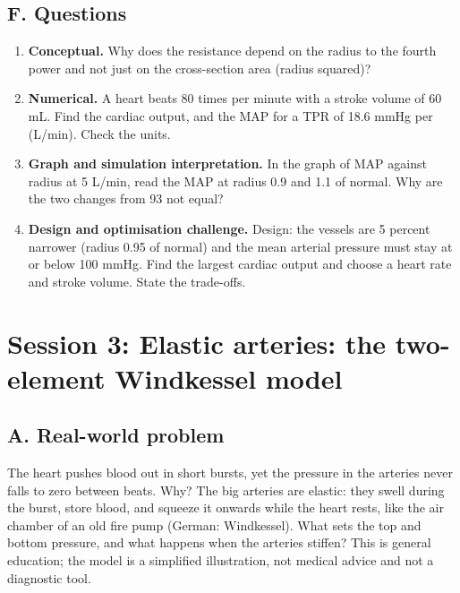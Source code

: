 \documentclass[11pt,a4paper]{article}
\begin{document}
\subsection*{F. Questions}
\begin{enumerate}[nosep]
\item \textbf{Conceptual.} Why does the resistance depend on the radius to the fourth power and not just on the cross-section area (radius squared)?
\item \textbf{Numerical.} A heart beats 80 times per minute with a stroke volume of 60 mL. Find the cardiac output, and the MAP for a TPR of 18.6 mmHg per (L/min). Check the units.
\item \textbf{Graph and simulation interpretation.} In the graph of MAP against radius at 5 L/min, read the MAP at radius 0.9 and 1.1 of normal. Why are the two changes from 93 not equal?
\item \textbf{Design and optimisation challenge.} Design: the vessels are 5 percent narrower (radius 0.95 of normal) and the mean arterial pressure must stay at or below 100 mmHg. Find the largest cardiac output and choose a heart rate and stroke volume. State the trade-offs.
\end{enumerate}

\section{Session 3: Elastic arteries: the two-element Windkessel model}

\subsection*{A. Real-world problem}
The heart pushes blood out in short bursts, yet the pressure in the arteries never falls to zero between beats. Why? The big arteries are elastic: they swell during the burst, store blood, and squeeze it onwards while the heart rests, like the air chamber of an old fire pump (German: Windkessel). What sets the top and bottom pressure, and what happens when the arteries stiffen? This is general education; the model is a simplified illustration, not medical advice and not a diagnostic tool.
\end{document}
